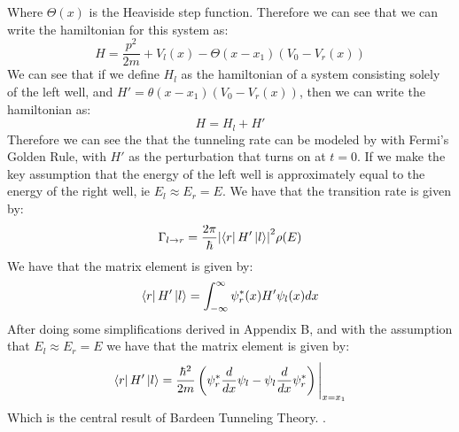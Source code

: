 \documentclass[
  reprint,
  amsmath,amssymb,
  aps
]{revtex4-1}
\begin{document}
Where $\Theta(x)$ is the Heaviside step function. 
Therefore we can see that we can write the hamiltonian for this system as:
\begin{equation}
    H = \frac{p^2}{2m} + V_l(x) - \Theta(x-x_1)(V_0-V_r(x))
\end{equation}
We can see that if we define $H_l$ as the hamiltonian of a system consisting solely of the left well, and $H' = 
\theta(x-x_1)(V_0-V_r(x))$, then we can write the hamiltonian as:
\begin{equation}
    H = H_l + H'
\end{equation}
Therefore we can see the that the tunneling rate can be modeled by with Fermi's Golden Rule, with $H'$ as the perturbation that 
turns on at $t=0$. If we 
make the key assumption that the energy of the left well is approximately equal to the energy of the right well, ie 
$E_l \approx E_r =E$. We have that the transition rate is given by:
\begin{equation}
    \Gamma_{l\rightarrow r} = \frac{2\pi}{\hbar}\abs{\bra{r}H'\ket{l}}^2\rho(E)
\end{equation}
We have that the matrix element is given by:
\begin{equation}
    \bra{r}H'\ket{l} = \int_{-\infty}^{\infty}\psi_r^*(x)H'\psi_l(x)dx
\end{equation}
After doing some simplifications derived in Appendix B, and with the assumption that $E_l \approx E_r =E$ we have that the matrix element is given by:
\begin{equation}
    \bra{r}H'\ket{l} = \frac{\hbar^2}{2m}\left(
        \psi_r^*\frac{d}{dx}\psi_l - \psi_l\frac{d}{dx}\psi_r^*
    \right)\Bigg|_{x=x_1}
\end{equation}
Which is the central result of Bardeen Tunneling Theory. \cite{BardeenTunneling}.
\end{document}
